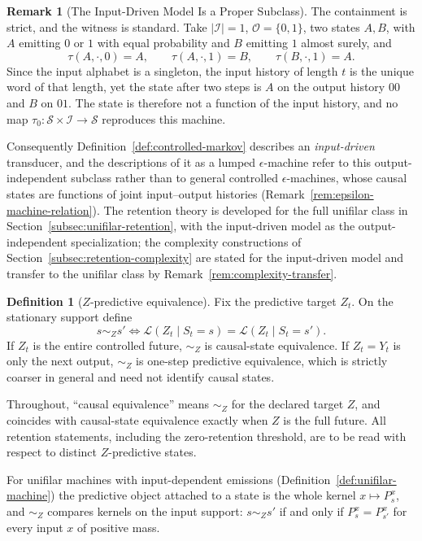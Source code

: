 \documentclass[12pt]{article}
\theoremstyle{definition}
\newtheorem{definition}[theorem]{Definition}
\newtheorem{remark}[theorem]{Remark}
\begin{document}
\begin{remark}[The Input-Driven Model Is a Proper Subclass]
\label{rem:unifilar-proper-subclass}
The containment is strict, and the witness is standard.  Take
$|\mathcal I|=1$, $\mathcal O=\{0,1\}$, two states $A,B$, with $A$ emitting
$0$ or $1$ with equal probability and $B$ emitting $1$ almost surely, and
\[
\tau(A,\cdot,0)=A,\qquad \tau(A,\cdot,1)=B,\qquad \tau(B,\cdot,1)=A .
\]
Since the input alphabet is a singleton, the input history of length $t$ is
the unique word of that length, yet the state after two steps is $A$ on the
output history $00$ and $B$ on $01$.  The state is therefore not a function of
the input history, and no map $\tau_0:\mathcal S\times\mathcal I\to\mathcal S$
reproduces this machine.

Consequently Definition~\ref{def:controlled-markov} describes an
\emph{input-driven} transducer, and the descriptions of it as a lumped
$\epsilon$-machine refer to this output-independent subclass rather than to
general controlled $\epsilon$-machines, whose causal states are functions of
joint input--output histories
(Remark~\ref{rem:epsilon-machine-relation}).  The retention theory is developed
for the full unifilar class in
Section~\ref{subsec:unifilar-retention}, with the input-driven model as the
output-independent specialization; the complexity constructions of
Section~\ref{subsec:retention-complexity} are stated for the input-driven model
and transfer to the unifilar class by
Remark~\ref{rem:complexity-transfer}.
\end{remark}

\begin{definition}[$Z$-predictive equivalence]
\label{def:z-predictive-equivalence}
Fix the predictive target $Z_t$.  On the stationary support define
\[
s\sim_Z s'
\iff
\mathcal L(Z_t\mid S_t=s)
=
\mathcal L(Z_t\mid S_t=s').
\]
If $Z_t$ is the entire controlled future, $\sim_Z$ is causal-state
equivalence.  If $Z_t=Y_t$ is only the next output, $\sim_Z$ is one-step
predictive equivalence, which is strictly coarser in general and need not
identify causal states.

Throughout, ``causal equivalence'' means $\sim_Z$ for the declared target
$Z$, and coincides with causal-state equivalence exactly when $Z$ is the full
future.  All retention statements, including the zero-retention threshold,
are to be read with respect to distinct $Z$-predictive states.

For unifilar machines with input-dependent emissions
(Definition~\ref{def:unifilar-machine}) the predictive object attached to a
state is the whole kernel $x\mapsto P_s^x$, and $\sim_Z$ compares kernels on
the input support: $s\sim_Zs'$ if and only if $P_s^x=P_{s'}^x$ for every input
$x$ of positive mass.
\end{definition}
\end{document}
